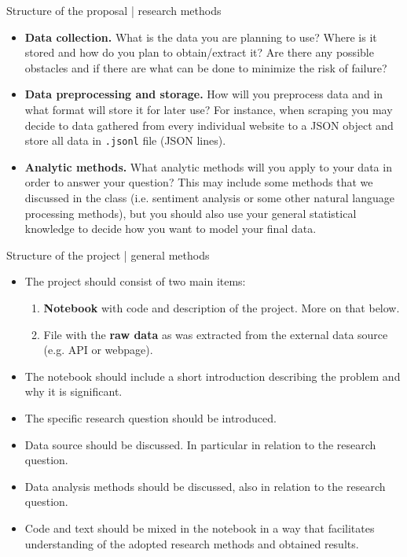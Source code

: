 \documentclass[aspectratio=169]{beamer}
\begin{document}
\begin{frame}{Structure of the proposal | research methods}
    \begin{itemize}
     \item \textbf{Data collection.} What is the data you are planning to use?
     Where is it stored and how do you plan to obtain/extract it?  Are there any
     possible obstacles and if there are what can be done to minimize the risk
     of failure?
     \item \textbf{Data preprocessing and storage.} How will you preprocess data
     and in what format will store it for later use? For instance, when scraping
     you may decide to data gathered from every individual website to a JSON
     object and store all data in \texttt{.jsonl} file (JSON lines).
     \item \textbf{Analytic methods.} What analytic methods will you apply to
     your data in order to answer your question? This may include some methods
     that we discussed in the class (i.e. sentiment analysis or some other
     natural language processing methods), but you should also use your general
     statistical knowledge to decide how you want to model your final data.
    \end{itemize}
\end{frame}
    
\begin{frame}{Structure of the project | general methods}
    \begin{itemize}
     \item The project should consist of two main items:
     \begin{enumerate}
     \item \textbf{Notebook} with code and description of the project.
     More on that below.
     \item File with the \textbf{raw data} as was extracted from the external
     data source (e.g. API or webpage).
     \end{enumerate}
     \item The notebook should include a short introduction describing the
     problem and why it is significant.
     \item The specific research question should be introduced.
     \item Data source should be discussed. In particular in relation to the
     research question.
     \item Data analysis methods should be discussed, also in relation to the
     research question.
     \item Code and text should be mixed in the notebook in a way that
     facilitates understanding of the adopted research methods and obtained
     results.
    \end{itemize}
\end{frame}
    
\end{document}
